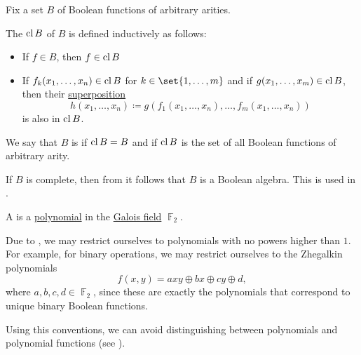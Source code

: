 \begin{definition}\label{def:boolean_closure}
  Fix a set \( B \) of Boolean functions of arbitrary arities.

  The  \( \operatorname{cl}{B} \) of \( B \) is defined inductively as follows:
  \begin{itemize}
    \item If \( f \in B \), then \( f \in \operatorname{cl}{B} \)
    \item If \( f_k(x_1, \ldots, x_n) \in \operatorname{cl}{B} \) for \( k \in \set{ 1, \ldots, m } \) and if \( g(x_1, \ldots, x_m) \in \operatorname{cl}{B} \), then their \hyperref[def:multi_valued_function/superposition]{superposition}
    \begin{equation*}
      h(x_1, \ldots, x_n) \coloneqq g(f_1(x_1, \ldots, x_n), \ldots, f_m(x_1, \ldots, x_n))
    \end{equation*}
    is also in \( \operatorname{cl}{B} \).
  \end{itemize}

  We say that \( B \) is  if \( \operatorname{cl}{B} = B \) and  if \( \operatorname{cl}{B} \) is the set of all Boolean functions of arbitrary arity.

  If \( B \) is complete, then from  it follows that \( B \) is a Boolean algebra. This is used in .
\end{definition}

\begin{definition}\label{def:zhegalkin_polynomial}
  A  is a \hyperref[def:polynomial]{polynomial} in the \hyperref[thm:galois_field_existence]{Galois field} \( \BbbF_2 \).

  Due to , we may restrict ourselves to polynomials with no powers higher than \( 1 \). For example, for binary operations, we may restrict ourselves to the Zhegalkin polynomials
  \begin{equation}\label{eq:def:zhegalkin_polynomial/binary_polynomial}
    f(x, y) = axy \oplus bx \oplus cy \oplus d,
  \end{equation}
  where \( a, b, c, d \in \BbbF_2 \), since these are exactly the polynomials that correspond to unique binary Boolean functions.

  Using this conventions, we can avoid distinguishing between polynomials and polynomial functions (see ).
\end{definition}

